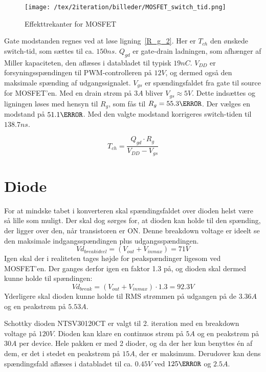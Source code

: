 \begin{figure}[H]
	\center
	\texttt{[image: /tex/2iteration/billeder/MOSFET\_switch\_tid.png]}
	\caption{Effekttrekanter for MOSFET}
	\label{fig:MOSFET_switch_tid}
\end{figure}

Gate modstanden regnes ved at løse ligning~\ref{R_g_2}\cite{gate_res}. Her er $T_{ch}$ den ønskede switch-tid, som sættes til ca. $150ns$. $Q_{gd}$ er gate-drain ladningen, som afhænger af Miller kapaciteten, den aflæses i databladet til typisk $19nC$. $V_{DD}$ er forsyningsspændingen til PWM-controlleren på $12V$, og dermed også den maksimale spænding af udgangssignalet. $V_{gs}$ er spændingsfaldet fra gate til source for MOSFET'en. Med en drain strøm på $3A$ bliver $V_{gs}\approx 5V$. Dette indsættes og ligningen løses med hensyn til $R_{g}$, som fås til $R_{g}=55.3\ohm$. Der vælges en modstand på $51.1\ohm$. Med den valgte modstand korrigeres switch-tiden til $138.7ns$.

\begin{equation} \label{R_g_2}
T_{ch} = \frac{Q_{gd} \cdot R_{g}}{V_{DD}-V_{gs}}
\end{equation}

\section{Diode}
For at mindske tabet i konverteren skal spændingsfaldet over dioden helst være så lille som muligt. Der skal dog sørges for, at dioden kan holde til den spænding, der ligger over den, når transistoren er ON. Denne breakdown voltage er ideelt se den maksimale indgangsspændingen plus udgangsspændingen.
\begin{equation} \label{Vd_breakideel}
Vd_{breakideel} = (V_{out}+V_{inmax}) = 71V
\end{equation}
Igen skal der i realiteten tages højde for peakspændinger ligesom ved MOSFET'en. Der ganges derfor igen en faktor 1.3 på, og dioden skal dermed kunne holde til spændingen:
\begin{equation} \label{Vd_break}
Vd_{break} = (V_{out}+V_{inmax}) \cdot 1.3 = 92.3V
\end{equation}
Yderligere skal dioden kunne holde til RMS strømmen på udgangen på de $3.36A$ og en peakstrøm på $5.53A$.

Schottky dioden NTSV30120CT\cite{NTSV30120} er valgt til 2. iteration med en breakdown voltage på $120V$. Dioden kan klare en continuos strøm på $5A$ og en peakstrøm på $30A$ per device. Hele pakken er med 2 dioder, og da der her kun benyttes én af dem, er det i stedet en peakstrøm på $15A$, der er maksimum. Derudover kan dens spændingsfald aflæses i databladet til ca. $0.45V$ ved $125\degreeCelsius$ og $2.5A$. 


